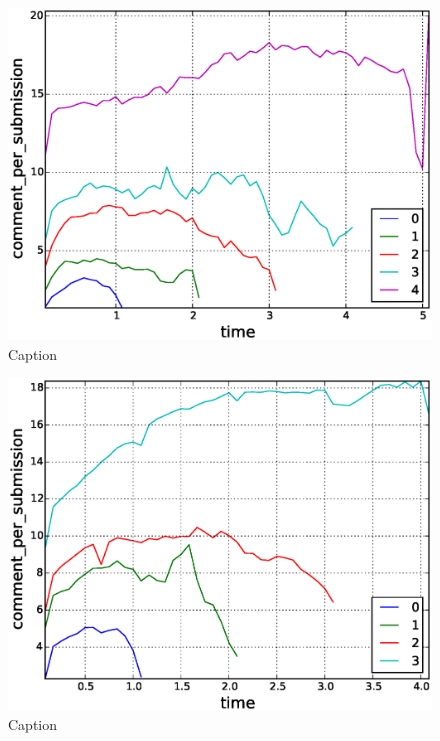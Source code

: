 \begin{figure}[!tb]
\centering
\includegraphics[scale=0.4]{./images/comments_per_submissions_for_surviving_year_for_2010.eps}
\caption{Caption}
\label{fig:comments_per_submissions_for_surviving_year_for_2010}
\end{figure}

\begin{figure}[!tb]
\centering
\includegraphics[scale=0.4]{./images/comments_per_submissions_for_surviving_year_for_2011.eps}
\caption{Caption}
\label{fig:comments_per_submissions_for_surviving_year_for_2011}
\end{figure}

